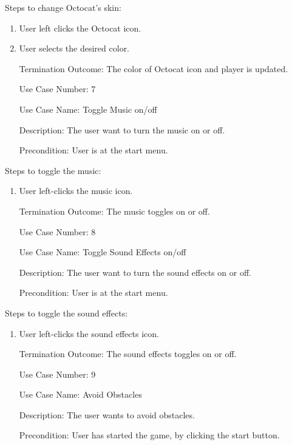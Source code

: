 \documentclass[10pt,conference,onecolumn,compsoc]{IEEEtran}
\begin{document}
Steps to change Octocat's skin:

\begin{enumerate}
\item User left clicks the Octocat icon.
\item User selects the desired color.
\item[Termination Outcome:] The color of Octocat icon and player is updated.\\
\end{enumerate}

\begin{itemize}
\item[Use Case Number:] 7
\item[Use Case Name:] Toggle Music on/off
\item[Description:] The user want to turn the music on or off.
\item[Precondition:] User is at the start menu.
\end{itemize}

Steps to toggle the music:

\begin{enumerate}
\item User left-clicks the music icon.
\item[Termination Outcome:] The music toggles on or off.\\
\end{enumerate}

\begin{itemize}
\item[Use Case Number:] 8
\item[Use Case Name:] Toggle Sound Effects on/off
\item[Description:] The user want to turn the sound effects  on or off.
\item[Precondition:] User is at the start menu.
\end{itemize}

Steps to toggle the sound effects:

\begin{enumerate}
\item User left-clicks the sound effects icon.
\item[Termination Outcome:] The sound effects toggles on or off.\\
\end{enumerate}

\begin{itemize}
\item[Use Case Number:] 9
\item[Use Case Name:] Avoid Obstacles
\item[Description:] The user wants to avoid obstacles.
\item[Precondition:] User has started the game, by clicking the start button.
\end{itemize}
\end{document}
